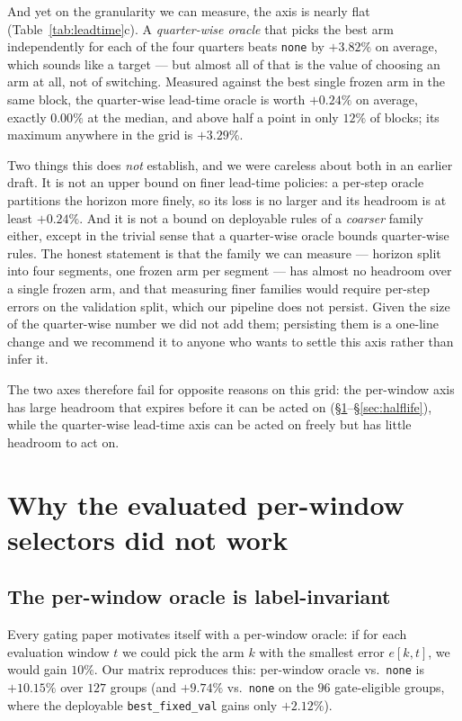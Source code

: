 \documentclass[a4paper,fleqn]{cas-sc}
\newcommand{\arm}[1]{\texttt{#1}}
\begin{document}
And yet on the granularity we can measure, the axis is nearly flat
(Table~\ref{tab:leadtime}c). A \emph{quarter-wise oracle} that
picks the best arm independently for each of the four quarters beats \arm{none} by
$+3.82\%$
on average, which sounds like a target --- but almost all of that is the value of
choosing an arm at all, not of switching. Measured against the best single frozen
arm in the same block, the quarter-wise lead-time oracle is worth $+0.24\%$ on
average, exactly $0.00\%$ at the median, and above half a point in only $12\%$ of
blocks; its maximum anywhere in the grid is $+3.29\%$.

Two things this does \emph{not} establish, and we were careless about both in an
earlier draft. It is not an upper bound on finer lead-time policies: a per-step
oracle partitions the horizon more finely, so its loss is no larger and its
headroom is at least $+0.24\%$. And it is not a bound on deployable rules of a
\emph{coarser} family either, except in the trivial sense that a quarter-wise
oracle bounds quarter-wise rules. The honest statement is that the family we can
measure --- horizon split into four segments, one frozen arm per segment --- has
almost no headroom over a single frozen arm, and that measuring finer families
would require per-step errors on the validation split, which our pipeline does not
persist. Given the size of the quarter-wise number we did not add them; persisting
them is a one-line change and we recommend it to anyone who wants to settle this
axis rather than infer it.

The two axes therefore fail for opposite reasons on this grid: the per-window axis
has large headroom that expires before it can be acted
on (\S\ref{sec:oracle}--\S\ref{sec:halflife}), while the quarter-wise lead-time
axis can be acted on freely but has little headroom to act on.

\section{Why the evaluated per-window selectors did not work}
\label{sec:oracle}

\subsection{The per-window oracle is label-invariant}

Every gating paper motivates itself with a per-window oracle: if for each
evaluation window $t$ we could pick the arm $k$ with the smallest error
$e[k,t]$, we would gain $10\%$. Our matrix reproduces this:
per-window oracle vs.\ \arm{none} is $+10.15\%$ over $127$ groups
(and $+9.74\%$ vs.\ \arm{none} on the $96$ gate-eligible groups, where the
deployable \arm{best\_fixed\_val} gains only $+2.12\%$).
\end{document}
